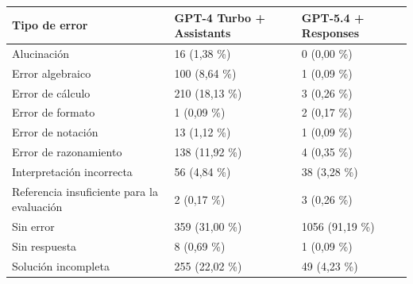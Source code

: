 \begin{tabular}{lll}
\toprule
Tipo de error & GPT-4 Turbo + Assistants & GPT-5.4 + Responses \\
\midrule
Alucinación & 16 (1,38 \%) & 0 (0,00 \%) \\
Error algebraico & 100 (8,64 \%) & 1 (0,09 \%) \\
Error de cálculo & 210 (18,13 \%) & 3 (0,26 \%) \\
Error de formato & 1 (0,09 \%) & 2 (0,17 \%) \\
Error de notación & 13 (1,12 \%) & 1 (0,09 \%) \\
Error de razonamiento & 138 (11,92 \%) & 4 (0,35 \%) \\
Interpretación incorrecta & 56 (4,84 \%) & 38 (3,28 \%) \\
Referencia insuficiente para la evaluación & 2 (0,17 \%) & 3 (0,26 \%) \\
Sin error & 359 (31,00 \%) & 1056 (91,19 \%) \\
Sin respuesta & 8 (0,69 \%) & 1 (0,09 \%) \\
Solución incompleta & 255 (22,02 \%) & 49 (4,23 \%) \\
\bottomrule
\end{tabular}

